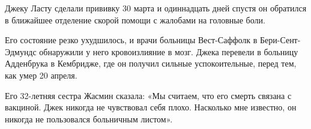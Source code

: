 Джеку Ласту сделали прививку 30 марта и одиннадцать дней спустя он обратился в
ближайшее отделение скорой помощи с жалобами на головные боли.

Его состояние резко ухудшилось, и врачи больницы Вест-Саффолк в
Бери-Сент-Эдмундс обнаружили у него кровоизлияние в мозг. Джека перевели в
больницу Адденбрука в Кембридже, где он получил сильные успокоительные, перед
тем, как умер 20 апреля.

Его 32-летняя сестра Жасмин сказала: «Мы считаем, что его смерть связана с
вакциной. Джек никогда не чувствовал себя плохо. Насколько мне известно, он
никогда не пользовался больничным листом».

